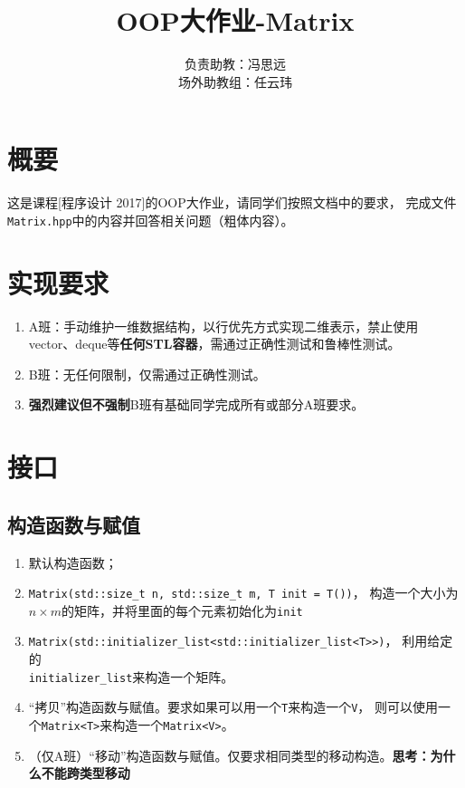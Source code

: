 \documentclass[12pt, a4paper]{article}
\title{OOP大作业-Matrix}
\author{负责助教：冯思远\\场外助教组：任云玮}
\date{}
\newcommand{\ilc}{\texttt}
\begin{document}
\maketitle
\tableofcontents
\newpage

\section{概要}
  这是课程[程序设计 2017]的OOP大作业，请同学们按照文档中的要求，
  完成文件\ilc{Matrix.hpp}中的内容并回答相关问题（粗体内容）。
  
\section{实现要求}
  \begin{enumerate}
  	\item A班：手动维护一维数据结构，以行优先方式实现二维表示，禁止使用vector、deque等\textbf{任何STL容器}，需通过正确性测试和鲁棒性测试。
  	\item B班：无任何限制，仅需通过正确性测试。
  	\item \textbf{强烈建议但不强制}B班有基础同学完成所有或部分A班要求。
  \end{enumerate}

\section{接口}

\subsection{构造函数与赋值}
  \begin{enumerate}
    \item 默认构造函数；
    \item \ilc{Matrix(std::size\_t n, std::size\_t m, T init = T())}，
    构造一个大小为$n\times m$的矩阵，并将里面的每个元素初始化为\ilc{init}
    \item \ilc{Matrix(std::initializer\_list<std::initializer\_list<T>>)}，
    利用给定的\\\ilc{initializer\_list}来构造一个矩阵。
    \item “拷贝”构造函数与赋值。要求如果可以用一个\ilc{T}来构造一个\ilc{V}，
    则可以使用一个\ilc{Matrix<T>}来构造一个\ilc{Matrix<V>}。
    \item （仅A班）“移动”构造函数与赋值。仅要求相同类型的移动构造。\textbf{思考：为什么不能跨类型移动}
  \end{enumerate}
\end{document}
